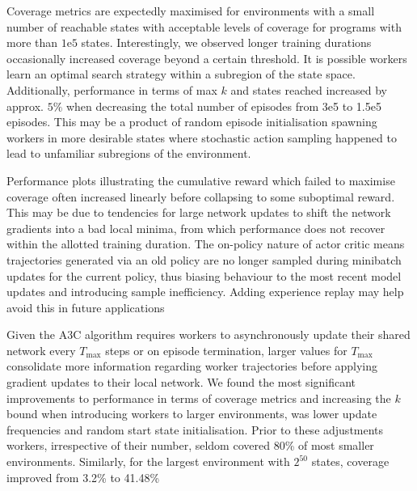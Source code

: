 \documentclass[runningheads]{llncs}
\begin{document}
Coverage metrics are expectedly maximised for environments with a small number of reachable states with acceptable levels of coverage for programs with more than $1\mathrm{e}{5}$ states. Interestingly, we observed longer training durations occasionally increased coverage beyond a certain threshold. It is possible workers learn an optimal search strategy within a subregion of the state space. Additionally, performance in terms of max $k$ and states reached increased by approx. $5\%$ when decreasing the total number of episodes from 3e5 to 1.5e5 episodes. This may be a product of random episode initialisation spawning workers in more desirable states where stochastic action sampling happened to lead to unfamiliar subregions of the environment.

Performance plots illustrating the cumulative reward  which failed to maximise coverage often increased linearly before collapsing to some suboptimal reward. This may be due to tendencies for large network updates to shift the network gradients into a bad local minima, from which performance does not recover within the allotted training duration. The on-policy nature of actor critic means trajectories generated via an old policy are no longer sampled during minibatch updates for the current policy,  thus biasing behaviour to the most recent model updates and introducing sample inefficiency. Adding experience replay \cite{wang2017sample} may help avoid this in future applications

Given the A3C algorithm requires workers to asynchronously update their shared network every $T_{\max}$ steps or on episode termination, larger values for $T_{\max}$ consolidate more information regarding worker trajectories before applying gradient updates to their local network. We found the most significant improvements to performance in terms of coverage metrics and increasing the $k$ bound when introducing workers to larger environments, was lower update frequencies and random start state initialisation. Prior to these adjustments workers, irrespective of their number, seldom covered 80\% of most smaller environments. Similarly, for the largest environment with $2^{50}$ states, coverage improved from 3.2\% to 41.48\%
\end{document}
